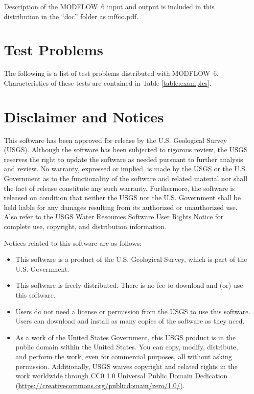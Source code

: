 \documentclass[11pt,twoside,twocolumn]{usgsreport}
\begin{document}
\noindent Description of the MODFLOW~6 input and output is included in this distribution in the ``doc'' folder as mf6io.pdf.

\section{Test Problems}
The following is a list of test problems distributed with MODFLOW~6.  Characteristics of these tests are contained in Table \ref{table:examples}.







\section{Disclaimer and Notices}

This software has been approved for release by the U.S. Geological Survey (USGS). Although the software has been subjected to rigorous review, the USGS reserves the right to update the software as needed pursuant to further analysis and review. No warranty, expressed or implied, is made by the USGS or the U.S. Government as to the functionality of the software and related material nor shall the fact of release constitute any such warranty. Furthermore, the software is released on condition that neither the USGS nor the U.S. Government shall be held liable for any damages resulting from its authorized or unauthorized use. Also refer to the USGS Water Resources Software User Rights Notice for complete use, copyright, and distribution information.

Notices related to this software are as follows:
\begin{itemize}
\item This software is a product of the U.S. Geological Survey, which is part of the U.S. Government.

\item This software is freely distributed. There is no fee to download and (or) use this software.

\item Users do not need a license or permission from the USGS to use this software. Users can download and install as many copies of the software as they need.

\item As a work of the United States Government, this USGS product is in the public domain within the United States. You can copy, modify, distribute, and perform the work, even for commercial purposes, all without asking permission. Additionally, USGS waives copyright and related rights in the work worldwide through CC0 1.0 Universal Public Domain Dedication (\url{https://creativecommons.org/publicdomain/zero/1.0/}).
\end{itemize}
\end{document}
